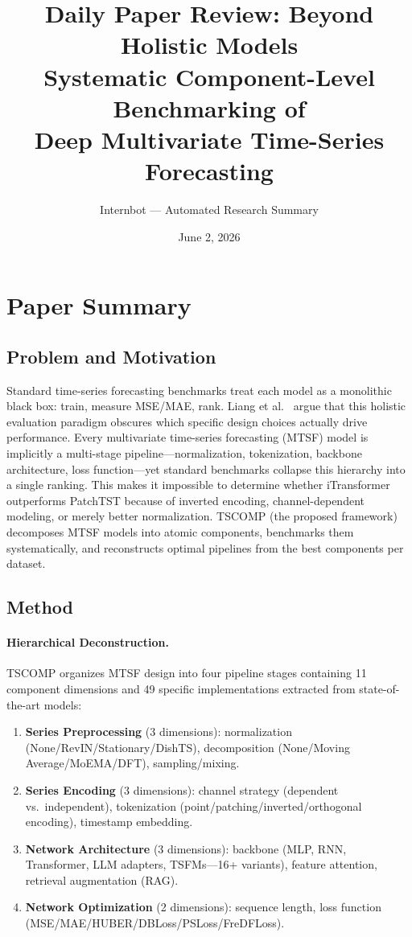 \documentclass[11pt,a4paper]{article}
\title{Daily Paper Review: Beyond Holistic Models\\Systematic Component-Level Benchmarking of\\Deep Multivariate Time-Series Forecasting}
\author{Internbot --- Automated Research Summary}
\date{June 2, 2026}
\begin{document}
\maketitle

\section{Paper Summary}

\subsection{Problem and Motivation}

Standard time-series forecasting benchmarks treat each model as a monolithic black box: train, measure MSE/MAE, rank. Liang et al.~\cite{liang2026tscomp} argue that this holistic evaluation paradigm obscures which specific design choices actually drive performance. Every multivariate time-series forecasting (MTSF) model is implicitly a multi-stage pipeline---normalization, tokenization, backbone architecture, loss function---yet standard benchmarks collapse this hierarchy into a single ranking. This makes it impossible to determine whether iTransformer outperforms PatchTST because of inverted encoding, channel-dependent modeling, or merely better normalization. TSCOMP (the proposed framework) decomposes MTSF models into atomic components, benchmarks them systematically, and reconstructs optimal pipelines from the best components per dataset.

\subsection{Method}

\paragraph{Hierarchical Deconstruction.} TSCOMP organizes MTSF design into four pipeline stages containing 11 component dimensions and 49 specific implementations extracted from state-of-the-art models:
\begin{enumerate}
\item \textbf{Series Preprocessing} (3 dimensions): normalization (None/RevIN/Stationary/DishTS), decomposition (None/Moving Average/MoEMA/DFT), sampling/mixing.
\item \textbf{Series Encoding} (3 dimensions): channel strategy (dependent vs.\ independent), tokenization (point/patching/inverted/orthogonal encoding), timestamp embedding.
\item \textbf{Network Architecture} (3 dimensions): backbone (MLP, RNN, Transformer, LLM adapters, TSFMs---16+ variants), feature attention, retrieval augmentation (RAG).
\item \textbf{Network Optimization} (2 dimensions): sequence length, loss function (MSE/MAE/HUBER/DBLoss/PSLoss/FreDFLoss).
\end{enumerate}
\end{document}

